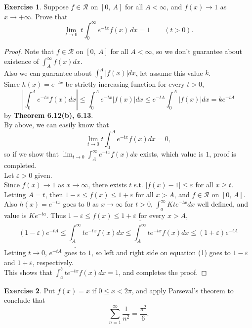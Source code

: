 \documentclass[12pt]{book}
\theoremstyle{definition}
\newtheorem{exe}{Exercise}
\begin{document}
	\begin{exe}
		Suppose $f\in\mathscr{R}$ on $[0,\ A]$ for all $A<\infty$, and $f(x)\rightarrow 1$ as $x\rightarrow +\infty$. Prove that $$\displaystyle\lim_{t\rightarrow 0}\ t\int_{0}^{\infty} e^{-tx}f(x)\,dx=1\qquad (t>0).$$
	\end{exe}
	\begin{proof}
		Note that $f\in\mathscr{R}$ on $[0,\ A]$ for all $A<\infty$, so we don't guarantee about existence of $\displaystyle\int_A^\infty f(x)dx$.\\
		Also we can guarantee about $\displaystyle\int_0 ^A |f(x)| dx$, let assume this value $k$.\\
		Since $h(x)=e^{-tx}$ be strictly increasing function for every $t>0$,$$\left\vert\int_0^A e^{-tx}f(x) dx\right\vert \leq \int_0^A e^{-tx}|f(x)|dx\leq e^{-tA}\int_0^A |f(x)|dx=ke^{-tA}$$by \textbf{Theorem 6.12(b), 6.13}.\\
		By above, we can easily know that $$\lim_{t\rightarrow 0} t\int_0^A e^{-tx}f(x)dx=0,$$ so if we show that $\displaystyle\lim_{t\rightarrow 0}\int_A^\infty e^{-tx}f(x)dx$ exists, which value is $1$, proof is completed.\\
		Let $\varepsilon>0$ given.\\
		Since $f(x)\rightarrow 1$ as $x\rightarrow\infty$, there exists $t$ s.t. $|f(x)-1|\leq \varepsilon$ for all $x\geq t$.\\
		Letting $A=t$, then $1-\varepsilon\leq f(x)\leq 1+\varepsilon$ for all $x>A$, and $f\in\mathscr{R}$ on $[0,\,A]$.\\
		Also $h(x)=e^{-tx}$ goes to $0$ as $x\rightarrow \infty$ for $t>0$, $\displaystyle \int_a^\infty Kte^{-tx}dx$ well defined, and value is $Ke^{-ta}$.
		Thus $1-\varepsilon\leq f(x)\leq 1+\varepsilon$ for every $x>A$, \begin{equation}
			(1-\varepsilon)e^{-tA}\leq\underline{\int_A^\infty} te^{-tx}f(x)dx\leq\overline{\int_A^\infty} te^{-tx}f(x)dx\leq (1+\varepsilon)e^{-tA}
		\end{equation}
		Letting $t\rightarrow 0$, $e^{-tA}$ goes to $1$, so left and right side on equation (1) goes to $1-\varepsilon$ and $1+\varepsilon$, respectively.\\
		This shows that $\displaystyle\int_a^b te^{-tx}f(x)dx=1$, and completes the proof.
	\end{proof}
	\newpage
	\setcounter{exe}{12}
	\begin{exe}
		Put $f(x)=x$ if $0\leq x < 2\pi$, and apply Parseval's theorem to conclude that $$\displaystyle\sum_{n=1}^{\infty} \dfrac{1}{n^2}=\dfrac{\pi^2}{6}.$$
	\end{exe}
\end{document}
